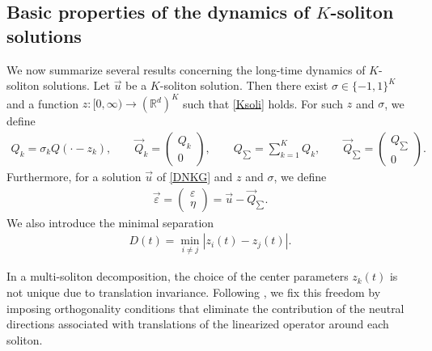 \documentclass[10pt,a4paper]{amsart}
\numberwithin{equation}{section}
\begin{document}
\subsection{Basic properties of the dynamics of $K$-soliton solutions}

We now summarize several results concerning the long-time dynamics of $K$-soliton solutions.
Let $\vec{u}$ be a $K$-soliton solution. Then there exist $\sigma\in\{-1,1\}^K$ and a function $z:[0,\infty)\to(\mathbb{R}^d)^K$ such that \eqref{Ksoli} holds.
For such $z$ and $\sigma$, we define
\begin{align*}
Q_k=\sigma_k Q(\cdot-z_k),\qquad
\vec{Q}_k=
\begin{pmatrix}
Q_k\\
0
\end{pmatrix},
\qquad
Q_{\sum}=\sum_{k=1}^KQ_k,\qquad
\vec{Q}_{\sum}=
\begin{pmatrix}
Q_{\sum}\\
0
\end{pmatrix}.
\end{align*}
Furthermore, for a solution $\vec{u}$ of \eqref{DNKG} and $z$ and $\sigma$, we define
\begin{align*}
\vec{\varepsilon}=
\begin{pmatrix}
\varepsilon\\
\eta
\end{pmatrix}
=\vec{u}-\vec{Q}_{\sum}.
\end{align*}
We also introduce the minimal separation
\begin{align*}
D(t)=\min_{i\neq j}|z_i(t)-z_j(t)|.
\end{align*}

In a multi-soliton decomposition, the choice of the center parameters $z_k(t)$ is not unique due to translation invariance.
Following \cite[Lemma 3.2]{I2}, we fix this freedom by imposing orthogonality conditions that eliminate the contribution of the neutral directions associated with translations of the linearized operator around each soliton.
\end{document}
